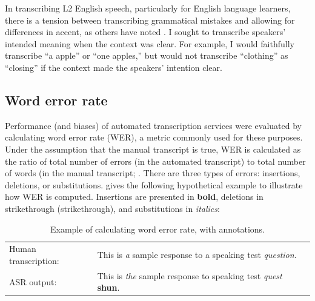 \documentclass [PhD] {uclathes}
\newlength{\wdth}
\newcommand{\strike}[1]{\settowidth{\wdth}{#1}\rlap{\rule[.5ex]{\wdth}{.4pt}}#1}
\begin{document}
In transcribing L2 English speech, particularly for English language learners, there is a tension between transcribing grammatical mistakes and allowing for differences in accent, as others have noted \citep{yoon2019features}. I sought to transcribe speakers’ intended meaning when the context was clear. For example, I would faithfully transcribe “a apple” or “one apples,” but would not transcribe “clothing” as “closing” if the context made the speakers’ intention clear.

\subsection{Word error rate}
\label{methods_wer}

Performance (and biases) of automated transcription services were evaluated by calculating word error rate (WER), a metric commonly used for these purposes. Under the assumption that the manual transcript is true, WER is calculated as the ratio of total number of errors (in the automated transcript) to total number of words (in the manual transcript; \cite{qian2019automatic}. There are three types of errors: insertions, deletions, or substitutions. \citet[][p. 65]{qian2019automatic} gives the following hypothetical example to illustrate how WER is computed. Insertions are presented in \textbf{bold}, deletions in \strike{strikethrough} (strikethrough), and substitutions in \emph{italics}:

\begin{table}[htbp]
\centering
\caption{\label{tab:wer_example} Example of calculating word error rate, with annotations.}
\small  %
\begin{tabular}{ll}
	\toprule
	Human transcription: & This is \emph{a} sample response to \strike{a} speaking test \emph{question}. \\
	ASR output: & This is \emph{the} sample response to speaking test \emph{quest} \textbf{shun}. \\
	\bottomrule
    \end{tabular}
\end{table}
\end{document}
